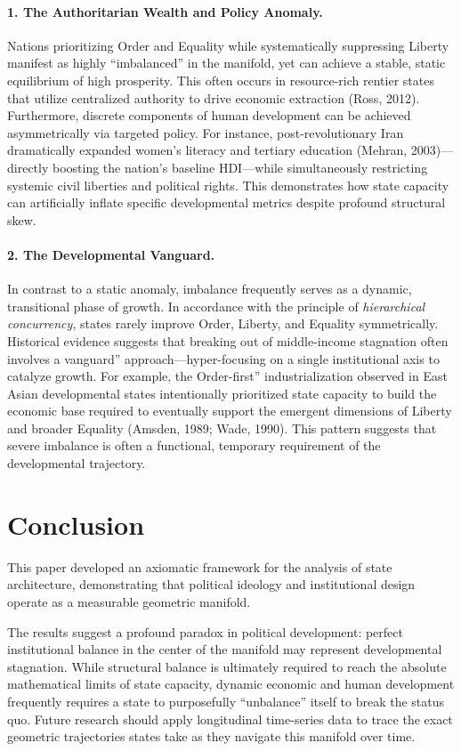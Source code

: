 \documentclass[12pt]{article}
\begin{document}
\paragraph{1. The Authoritarian Wealth and Policy Anomaly.}
Nations prioritizing Order and Equality while systematically suppressing Liberty manifest as highly ``imbalanced'' in the manifold, yet can achieve a stable, static equilibrium of high prosperity. This often occurs in resource-rich rentier states that utilize centralized authority to drive economic extraction (Ross, 2012). Furthermore, discrete components of human development can be achieved asymmetrically via targeted policy. For instance, post-revolutionary Iran dramatically expanded women's literacy and tertiary education (Mehran, 2003)—directly boosting the nation's baseline HDI—while simultaneously restricting systemic civil liberties and political rights. This demonstrates how state capacity can artificially inflate specific developmental metrics despite profound structural skew.

\paragraph{2. The Developmental Vanguard.}
In contrast to a static anomaly, imbalance frequently serves as a dynamic, transitional phase of growth. In accordance with the principle of \textit{hierarchical concurrency}, states rarely improve Order, Liberty, and Equality symmetrically. Historical evidence suggests that breaking out of middle-income stagnation often involves a vanguard'' approach—hyper-focusing on a single institutional axis to catalyze growth. For example, the Order-first'' industrialization observed in East Asian developmental states intentionally prioritized state capacity to build the economic base required to eventually support the emergent dimensions of Liberty and broader Equality (Amsden, 1989; Wade, 1990). This pattern suggests that severe imbalance is often a functional, temporary requirement of the developmental trajectory.

\section{Conclusion}

This paper developed an axiomatic framework for the analysis of state architecture, demonstrating that political ideology and institutional design operate as a measurable geometric manifold.

The results suggest a profound paradox in political development: perfect institutional balance in the center of the manifold may represent developmental stagnation. While structural balance is ultimately required to reach the absolute mathematical limits of state capacity, dynamic economic and human development frequently requires a state to purposefully ``unbalance'' itself to break the status quo. Future research should apply longitudinal time-series data to trace the exact geometric trajectories states take as they navigate this manifold over time.
\end{document}
